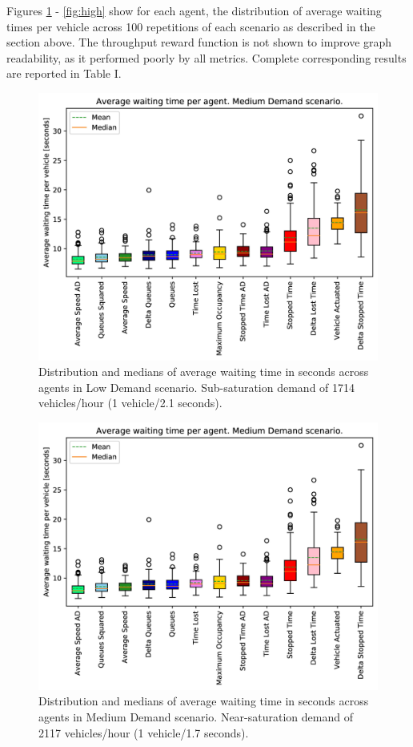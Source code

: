 \documentclass[conference]{IEEEtran}
\begin{document}
Figures \ref{fig:low} - \ref{fig:high} show for each agent, the distribution of average waiting times per vehicle across 100 repetitions of each scenario as described in the section above.
The throughput reward function is not shown to improve graph readability, as it performed poorly by all metrics. 
Complete corresponding results are reported in Table I.
\begin{figure}[thpb]
    \centering
    \includegraphics[width=\linewidth]{figures/rand_2_1_ordered_color_DS.jpg}
    \caption{Distribution and medians of average waiting time in seconds across agents in Low Demand scenario. Sub-saturation demand of 1714 vehicles/hour (1 vehicle/2.1 seconds).}
    \label{fig:low}
\end{figure}

\begin{figure}[thpb]
    \centering
    \includegraphics[width=\linewidth]{figures/rand_1_7_ordered_color_DS.jpg}
    \caption{Distribution and medians of average waiting time in seconds across agents in Medium Demand scenario. Near-saturation demand of 2117 vehicles/hour (1 vehicle/1.7 seconds).}
    \label{fig:mid}
\end{figure}
\end{document}
